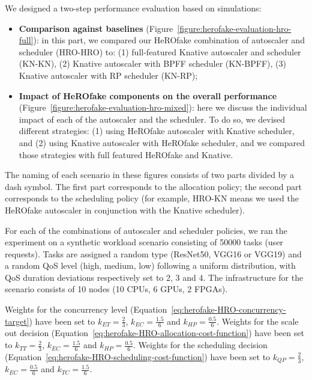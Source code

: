 We designed a two-step performance evaluation based on simulations:

\begin{itemize}
    \item \textbf{Comparison against baselines} (Figure~\ref{figure:herofake-evaluation-hro-full}): in this part, we compared our HeROfake combination of autoscaler and scheduler (HRO-HRO) to: (1) full-featured Knative autoscaler and scheduler (KN-KN), (2) Knative autoscaler with BPFF scheduler (KN-BPFF), (3) Knative autoscaler with RP scheduler (KN-RP); 
    \item \textbf{Impact of HeROfake components on the overall performance} (Figure~\ref{figure:herofake-evaluation-hro-mixed}): here we discuss the individual impact of each of the autoscaler and the scheduler. To do so, we devised different strategies: (1) using HeROfake autoscaler with Knative scheduler, and (2) using Knative autoscaler with HeROfake scheduler, and we compared those strategies with full featured HeROfake and Knative.
\end{itemize}

The naming of each scenario in these figures consists of two parts divided by a dash symbol. The first part corresponds to the allocation policy; the second part corresponds to the scheduling policy (for example, HRO-KN means we used the HeROfake autoscaler in conjunction with the Knative scheduler). 


For each of the combinations of autoscaler and scheduler policies, we ran the experiment on a synthetic workload scenario consisting of 50000 tasks (user requests). Tasks are assigned a random type (ResNet50, VGG16 or VGG19) and a random QoS level (high, medium, low) following a uniform distribution, with QoS duration deviations respectively set to 2, 3 and 4. The infrastructure for the scenario consists of 10 nodes (10 CPUs, 6 GPUs, 2 FPGAs).

Weights for the concurrency level (Equation~\ref{eq:herofake-HRO-concurrency-target}) have been set to $k_{ET} = \frac{2}{3}$, $k_{EC} = \frac{1.5}{6}$ and $k_{HP} = \frac{0.5}{6}$. Weights for the scale out decision (Equation~\ref{eq:herofake-HRO-allocation-cost-function}) have been set to $k_{TT} = \frac{2}{3}$, $k_{EC} = \frac{1.5}{6}$ and $k_{HP} = \frac{0.5}{6}$. Weights for the scheduling decision (Equation~\ref{eq:herofake-HRO-scheduling-cost-function}) have been set to $k_{QP} = \frac{2}{3}$, $k_{EC} = \frac{0.5}{6}$ and $k_{TC} = \frac{1.5}{6}$. 

